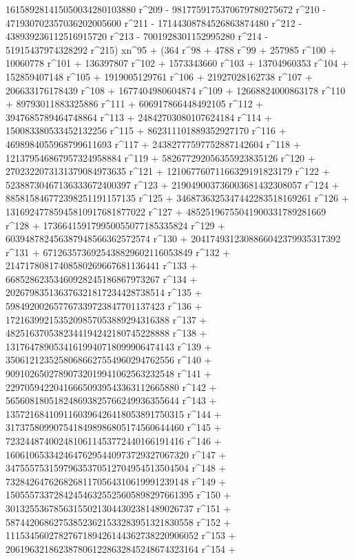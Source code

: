        161589281415050034280103880 r^209 - 
       9817759175370679780275672 r^210 - 
       471930702357036202005600 r^211 - 
       17144308784526863874480 r^212 - 438939236112516915720 r^213 - 
       7001928301152995280 r^214 - 
       51915437974328292 r^215) xn^95 + (364 r^98 + 4788 r^99 + 
       257985 r^100 + 10060778 r^101 + 136397807 r^102 + 
       1573343660 r^103 + 13704960353 r^104 + 152859407148 r^105 + 
       1919005129761 r^106 + 21927028162738 r^107 + 
       206633176178439 r^108 + 1677404980604874 r^109 + 
       12668824000863178 r^110 + 89793011883325886 r^111 + 
       606917866448492105 r^112 + 3947685789464748864 r^113 + 
       24842703080107624184 r^114 + 150083380533452132256 r^115 + 
       862311101889352927170 r^116 + 4698984055968799611693 r^117 + 
       24382777597752887142604 r^118 + 
       121379546867957324958884 r^119 + 
       582677292056355923835126 r^120 + 
       2702322073131379084973635 r^121 + 
       12106776071166329191823179 r^122 + 
       52388730467136333672400397 r^123 + 
       219049003736003681432308057 r^124 + 
       885815846772398251191157135 r^125 + 
       3468736325347442283518169261 r^126 + 
       13169247785945810917681877022 r^127 + 
       48525196755041900331789281669 r^128 + 
       173664159179950055077185335824 r^129 + 
       603948782456387948566362572574 r^130 + 
       2041749312308866042379935317392 r^131 + 
       6712635736925438829602116053849 r^132 + 
       21471780817408580269667681136441 r^133 + 
       66852862353460928245186867973267 r^134 + 
       202679835136376321817234428738514 r^135 + 
       598492002657767339723847701137423 r^136 + 
       1721639921535209857053889294316388 r^137 + 
       4825163705382344194242180745228888 r^138 + 
       13176478905341619940718099906474143 r^139 + 
       35061212352580686627554960294762556 r^140 + 
       90910265027890732019941062563232548 r^141 + 
       229705942204166650939543363112665880 r^142 + 
       565608180518248693825766249936355644 r^143 + 
       1357216841091160396426418053891750315 r^144 + 
       3173758099075418498986805174560644460 r^145 + 
       7232448740024810611453772440166191416 r^146 + 
       16061065334246476295440973729327067320 r^147 + 
       34755575315979635370512704954513504504 r^148 + 
       73284264762682681170564310619991239148 r^149 + 
       150555733728424546325525605898297661395 r^150 + 
       301325536785631550213044302381489026737 r^151 + 
       587442068627538523621533283951321830558 r^152 + 
       1115345602782767189426144362738220906052 r^153 + 
       2061963218623878061228632845248674323164 r^154 + 
